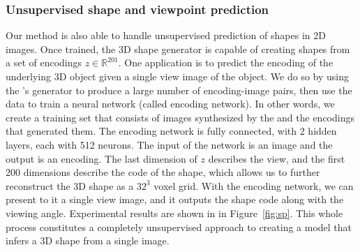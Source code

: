 \subsubsection{Unsupervised shape and viewpoint prediction}
Our method is also able to handle unsupervised prediction of shapes in 2D images.
Once trained, the 3D shape generator is capable of creating shapes from
a set of encodings $z \in \mathbb{R}^{201}$.
One application is to predict the encoding of the underlying 3D object given a single view image of the object.
We do so by using the \prgan's generator to produce a large number of
encoding-image pairs, then use the data to train a neural network
(called encoding network). In other words, we create a training set
that consists of images synthesized by the \prgan and the encodings
that generated them. The encoding network is fully connected, with 2
hidden layers, each with 512 neurons.
The input of the network is an image and the output is an encoding.
The last dimension of $z$ describes the view, and the first 200
dimensions describe the code of the shape, which allows us to further
reconstruct the 3D shape as a $32^3$ voxel grid. With the encoding
network, we can present to it a single view image, and it outputs the
shape code along with the viewing angle. 
Experimental results are shown in in Figure~\ref{fig:sp}. This whole
process constitutes a completely unsupervised approach to creating a
model that infers a 3D shape from a single image.


